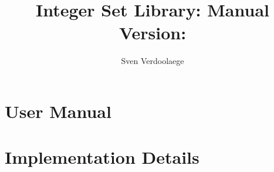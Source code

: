 \documentclass{report}
\numberwithin{theorem}{section}
\numberwithin{def}{section}
\numberwithin{example}{section}
\begin{document}
\title{Integer Set Library: Manual\\
\small Version:  }
\author{Sven Verdoolaege}

\maketitle
\tableofcontents

\chapter{User Manual}



\chapter{Implementation Details}





\end{document}
